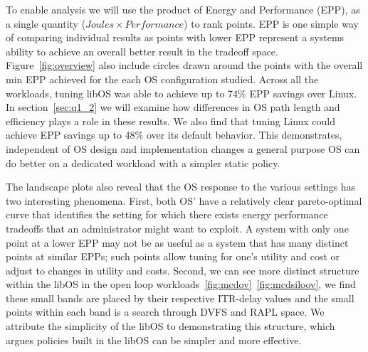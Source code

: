 To enable analysis we will use the product of Energy and Performance  (EPP), as a single quantity ($Joules \times Performance$) to rank points. EPP is one simple way of comparing individual results as points with lower EPP represent a systems ability to achieve an overall better result in the tradeoff space. Figure~\ref{fig:overview} also include circles drawn around the points with the overall min EPP achieved for the each OS configuration studied. Across all the workloads, tuning libOS was able to achieve up to 74\% EPP savings over Linux. In section~\ref{sec:q1_2} we will examine how differences in OS path length and efficiency plays a role in these results. We also find that tuning Linux could achieve EPP savings up to 48\% over its default behavior. This demonstrates, independent of OS design and implementation changes a general purpose OS can do better on a dedicated workload with a simpler static policy.


The landscape plots also reveal that the OS response to the various settings has two interesting phenomena.  First, both OS' have a relatively clear pareto-optimal curve that identifies the setting for which there exists energy performance tradeoffs that an administrator might want to exploit. A system with only one point at a lower EPP may not be as useful as a system that has many distinct points at similar EPPs; such points allow tuning for one's utility and cost or adjust to changes in utility and costs. Second, we can see more distinct structure within the libOS in the open loop workloads~\ref{fig:mcdov}~\ref{fig:mcdsiloov}, we find these small bands are placed by their respective ITR-delay values and the small points within each band is a search through DVFS and RAPL space. We attribute the simplicity of the libOS to demonstrating this structure, which argues policies built in the libOS can be simpler and more effective.
 
